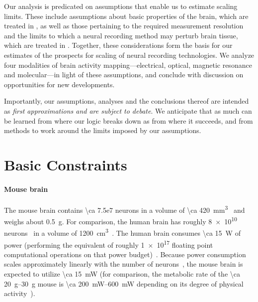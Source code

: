 \begin{figure}[htbp]
\hspace{0.5in}
\end{figure}

Our analysis is predicated on assumptions that enable us to estimate scaling limits.
These include assumptions about basic properties of the brain, which are treated in , as well as those pertaining to the required measurement resolution and the limits to which a neural recording method may perturb brain tissue, which are treated in .
Together, these considerations form the basis for our estimates of the prospects for scaling of neural recording technologies.
We analyze four modalities of brain activity mapping---electrical, optical, magnetic resonance and molecular---in light of these assumptions, and conclude with discussion on opportunities for new developments.

Importantly, our assumptions, analyses and the conclusions thereof are intended as \emph{first approximations and are subject to debate}.
We anticipate that as much can be learned from where our logic breaks down as from where it succeeds, and from methods to work around the limits imposed by our assumptions.

\section{Basic Constraints}
\label{sec:constraints}

\paragraph{Mouse brain}
The mouse brain contains \num{\ca 7.5e7} neurons in a volume of \SI{\ca 420}{\milli\meter\cubed}~\cite{vincent10} and weighs about \SI{0.5}{\gram}.
For comparison, the human brain has roughly \num{8e10} neurons~\cite{azevedo09} in a volume of \SI{1200}{\centi\meter\cubed}~\cite{allen02}.
The human brain consumes \SI{\ca 15}{\watt} of power (performing the equivalent of roughly \num{1e17} floating point computational operations on that power budget)~\cite{sarpeshkar10}.
Because power consumption scales approximately linearly with the number of neurons~\cite{houzel11}, the mouse brain is expected to utilize \SI{\ca 15}{\milli\watt} (for comparison, the metabolic rate of the \SIrange{\ca 20}{30}{\gram} mouse is \SIrange{\ca 200}{600}{\milli\watt} depending on its degree of physical activity~\cite{speakman13}).

